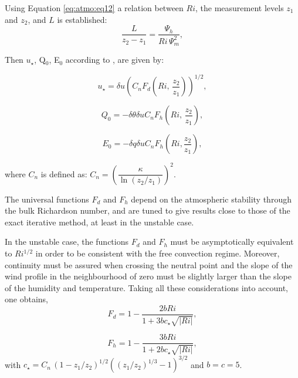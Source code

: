 Using Equation \eqref{eq:atmo:eq12} a relation between $Ri$, the measurement levels $z_{1}$ and
$z_{2}$, and $L$ is established:
\begin{equation}
\label{eq14}
\frac{L}{z_{2} -z_{1}
}=\frac{\Psi_{h} }{Ri\,\Psi_{m}^{2}},
\end{equation}

Then $u_{\star} $, Q$_{0}$, E$_{0}$ according to \cite{Louis:1982}, are
given by:

\begin{equation}
\label{eq15}
u_{\star} =\delta u \left( C_{n} F_{d} \left(Ri, \, \frac{z_{2}}{z_{1}} \right) \right)^{1/2},
\end{equation}

\begin{equation}
\label{eq16}
Q_{0} =-\delta \theta \delta u C_{n} F_{h} \left( Ri,\,\frac{z_{2} }{z_{1} }\right),
\end{equation}

\begin{equation}
\label{eq17}
E_{0} =-\delta q \delta u C_{n} F_{h} \left( Ri, \frac {z_{2}}{z_{1}} \right),
\end{equation}

where $C_{n} $ is defined as: $C_{n} =\left(
{\dfrac{\kappa}{\ln(z_{2} /z_{1} )}}
\right)^{2}$.

The universal functions $F_{d}$ and $F_{h}$ depend on the atmospheric
stability through the bulk Richardson number, and are tuned to give results
close to those of the exact iterative method, at least in the unstable case.

In the unstable case, the functions $F_{d}$ and $F_{h}$ must be
asymptotically equivalent to $Ri^{1/2}$ in order to be consistent with the
free convection regime. Moreover, continuity must be assured when crossing
the neutral point and the slope of the wind profile in the neighbourhood of
zero must be slightly larger than the slope of the humidity and temperature.
Taking all these considerations into account, one obtains,
\begin{equation}
\label{eq18}
F_{d} =1-\frac{2bRi
}{1+3b c_{\star} \sqrt {\left| {Ri} \right|} },
\end{equation}

\begin{equation}
\label{eq19}
F_{h}
=1-\frac{{3bRi}}{1+{2bc}_{\star} \sqrt
{\left| {{Ri}} \right|} },
\end{equation}
with $c_{\star} =C_{n} \, \left(
{1-z_{1} /z_{2} }
\right)^{1/2}\left( {(z_{1} /z_{2}
)^{1/3}-1} \right)^{3/2}$ and $b = c = 5$.

